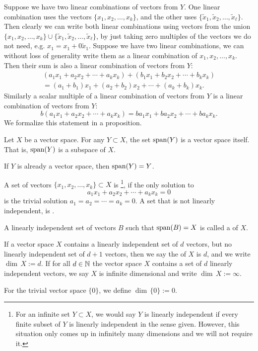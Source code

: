 Suppose we have two linear combinations of vectors from $Y$.  One linear
combination uses the vectors $\{ x_1,x_2,\ldots,x_k \}$, and the other uses
$\{ \widetilde{x}_1,\widetilde{x}_2,\ldots,\widetilde{x}_\ell \}$.  Then clearly we can write
both linear combinations using vectors from the union
$\{ x_1,x_2,\ldots,x_k \} \cup
\{ \widetilde{x}_1,\widetilde{x}_2,\ldots,\widetilde{x}_\ell \}$, by just taking zero
multiples of the vectors we do not need, e.g. $x_1 = x_1 + 0 \widetilde{x}_1$.
Suppose we have two linear combinations, we can without loss of
generality write them as a linear combination of $x_1,x_2,\ldots,x_k$.
Then their sum is also a linear combination of vectors from $Y$:
\begin{multline*}
(a_1 x_1 + 
a_2 x_2 +  \cdots
+ a_k x_k)
+
(b_1 x_1 + 
b_2 x_2 +  \cdots
+ b_k x_k)
\\
=
(a_1 + b_1) x_1 + 
(a_2 + b_2) x_2 +  \cdots
+ (a_k + b_k) x_k .
\end{multline*}
Similarly 
a scalar multiple of a linear combination of vectors from $Y$
is a linear combination of vectors from $Y$:
\begin{equation*}
b (a_1 x_1 + 
a_2 x_2 +  \cdots
+ a_k x_k)
=
b a_1  x_1 + 
b a_2 x_2 +  \cdots
+ b a_k x_k .
\end{equation*}
We formalize this statement in a proposition.

\begin{prop}
Let $X$ be a vector space.  For any $Y \subset X$,
the set $\operatorname{span}(Y)$ is a vector space itself.
That is, $\operatorname{span}(Y)$ is a subspace of $X$.
\end{prop}

If $Y$ is already a vector space, then $\operatorname{span}(Y) = Y$.

\begin{defn}
A set of vectors $\{ x_1, x_2, \ldots, x_k \} \subset X$ is 
\emph{}\footnote{%
For an infinite set $Y \subset X$, we would say $Y$ is linearly
independent if every finite subset of $Y$ is linearly independent
in the sense given.
However, this situation only comes up in infinitely many dimensions and
we will not require it.},
if the only solution to
\begin{equation} \label{eq:lincomb}
a_1 x_1 + a_2 x_2 + \cdots + a_k x_k = 0
\end{equation}
is the trivial solution $a_1 = a_2 = \cdots = a_k = 0$.
A set that is not linearly independent, is
\emph{}.

A linearly independent set of vectors $B$ such that
$\operatorname{span}(B) = X$ 
is called a \emph{} of $X$.

If a vector space $X$ contains a linearly independent set of $d$ vectors,
but no linearly independent set of $d+1$ vectors, then we say
the \emph{} of $X$ is $d$, and we write $\dim \, X := d$.  If for all $d \in {\mathbb{N}}$ the vector space
$X$ contains a set of $d$ linearly independent vectors, we say
$X$ is infinite dimensional and write $\dim \, X := \infty$.

For the trivial vector space $\{ 0 \}$, we define $\dim \, \{ 0 \} := 0$.
\end{defn}


